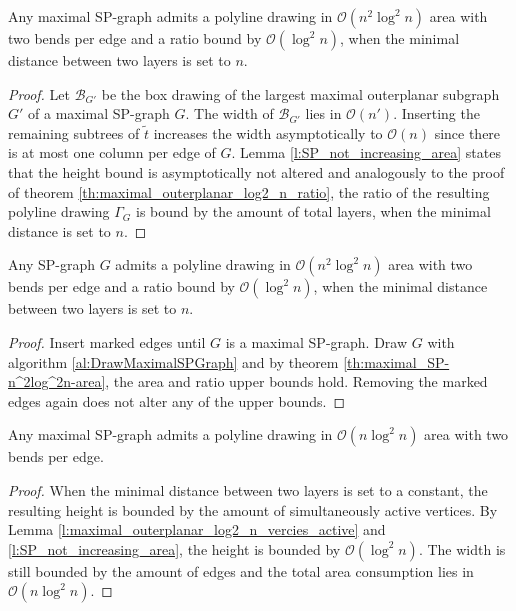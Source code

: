 
\begin{theorem}
	Any maximal SP-graph admits a polyline drawing in $\mathcal{O}(n^2 \log^2 n)$ area with two bends per edge and a ratio bound by $\mathcal{O}(\log^2 n)$, when the minimal distance between two layers is set to $n$. \label{th:maximal_SP-n^2log^2n-area}
\end{theorem}
\begin{proof}
	Let $\mathcal{B}_{G'}$ be the box drawing of the largest maximal outerplanar subgraph $G'$ of a maximal SP-graph $G$. The width of $\mathcal{B}_{G'}$ lies in $\mathcal{O}(n')$. Inserting the remaining subtrees of $\tilde{t}$ increases the width asymptotically to $\mathcal{O}(n)$ since there is at most one column per edge of $G$. Lemma \ref{l:SP_not_increasing_area} states that the height bound is asymptotically not altered and analogously to the proof of theorem \ref{th:maximal_outerplanar_log2_n_ratio}, the ratio of the resulting polyline drawing $\Gamma_G$ is bound by the amount of total layers, when the minimal distance is set to $n$.
\end{proof}
\begin{theorem}
	Any SP-graph $G$ admits a polyline drawing in $\mathcal{O}(n^2 \log^2 n)$ area with two bends per edge and a ratio bound by $\mathcal{O}(\log^2 n)$, when the minimal distance between two layers is set to $n$.
\end{theorem}
\begin{proof}
	Insert marked edges until $G$ is a maximal SP-graph. Draw $G$ with algorithm \ref{al:DrawMaximalSPGraph} and by theorem \ref{th:maximal_SP-n^2log^2n-area}, the area and ratio upper bounds hold. Removing the marked edges again does not alter any of the upper bounds.
\end{proof}


\begin{theorem}
	Any maximal SP-graph admits a polyline drawing in $\mathcal{O}(n \log^2 n)$ area with two bends per edge.
\end{theorem}
\begin{proof}
	When the minimal distance between two layers is set to a constant, the resulting height is bounded by the amount of simultaneously active vertices. By Lemma \ref{l:maximal_outerplanar_log2_n_vercies_active} and \ref{l:SP_not_increasing_area}, the height is bounded by $\mathcal{O}(\log^2 n)$. The width is still bounded by the amount of edges and the total area consumption lies in $\mathcal{O}(n \log^2 n)$.
\end{proof}


